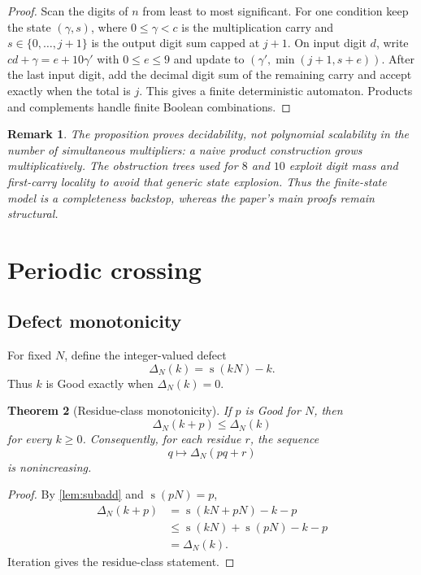\documentclass[11pt]{article}
\newtheorem{theorem}{Theorem}[section]
\newtheorem{remark}[theorem]{Remark}
\newcommand{\ds}{\operatorname{s}}
\newcommand{\Def}{\Delta}
\begin{document}
\begin{proof}
Scan the digits of $n$ from least to most significant.  For one condition keep the state $(\gamma,s)$, where $0\le\gamma<c$ is the multiplication carry and $s\in\{0,\ldots,j+1\}$ is the output digit sum capped at $j+1$.  On input digit $d$, write $cd+\gamma=e+10\gamma'$ with $0\le e\le9$ and update to $(\gamma',\min(j+1,s+e))$.  After the last input digit, add the decimal digit sum of the remaining carry and accept exactly when the total is $j$.  This gives a finite deterministic automaton.  Products and complements handle finite Boolean combinations.
\end{proof}

\begin{remark}
The proposition proves decidability, not polynomial scalability in the number of simultaneous multipliers: a naive product construction grows multiplicatively.  The obstruction trees used for $8$ and $10$ exploit digit mass and first-carry locality to avoid that generic state explosion.  Thus the finite-state model is a completeness backstop, whereas the paper's main proofs remain structural.
\end{remark}

\section{Periodic crossing}

\subsection{Defect monotonicity}
For fixed $N$, define the integer-valued defect
\begin{equation}\label{eq:defect}
  \Def_N(k)=\ds(kN)-k.
\end{equation}
Thus $k$ is Good exactly when $\Def_N(k)=0$.

\begin{theorem}[Residue-class monotonicity]\label{thm:antitone}
If $p$ is Good for $N$, then
\[
  \Def_N(k+p)\le\Def_N(k)
\]
for every $k\ge0$.  Consequently, for each residue $r$, the sequence
\[
  q\longmapsto \Def_N(pq+r)
\]
is nonincreasing.
\end{theorem}

\begin{proof}
By \cref{lem:subadd} and $\ds(pN)=p$,
\[
\begin{aligned}
\Def_N(k+p)
 &=\ds(kN+pN)-k-p\\
 &\le\ds(kN)+\ds(pN)-k-p\\
 &=\Def_N(k).
\end{aligned}
\]
Iteration gives the residue-class statement.
\end{proof}
\end{document}
